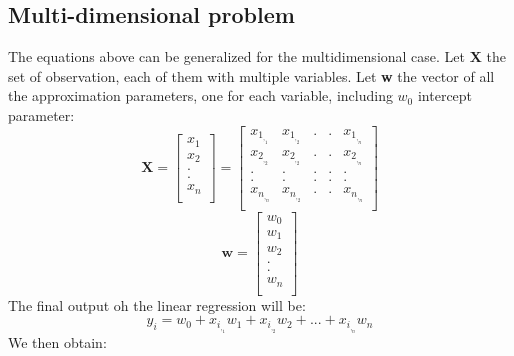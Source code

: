 \documentclass[10pt]{article}
\begin{document}
\subsection{Multi-dimensional problem}
The equations above can be generalized for the multidimensional case. Let \textbf{X} the set of observation, each of
them with multiple variables. Let \textbf{w} the vector of all the
approximation parameters, one for each variable, including $w_0$
intercept parameter:
\begin{equation}
    \textbf{X} =\begin{bmatrix}
            x_1\\
            x_2\\
            .\\
            .\\
            x_n\\
        \end{bmatrix} =
        \begin{bmatrix}
            x_1_,_1 & x_1_,_2 &.&.&x_1_,_n\\
            x_2_,_2 & x_2_,_2 &.&.&x_2_,_n\\
            .&.&.&.&.\\
            .&.&.&.&.\\
            x_n_,_n & x_n_,_2 &.&.&x_n_,_n\\
        \end{bmatrix}
\end{equation}
\begin{equation}
    \textbf{w} =\begin{bmatrix}
            w_0\\
            w_1\\
            w_2\\
            .\\
            .\\
            w_n\\
        \end{bmatrix} 
\end{equation}
The final output oh the linear regression will be:
\begin{equation}
    y_i = w_0 + x_i_,_1 w_1 + x_i_,_2 w_2 + ... + x_i_,_n w_n
\end{equation}
We then obtain:
\end{document}
